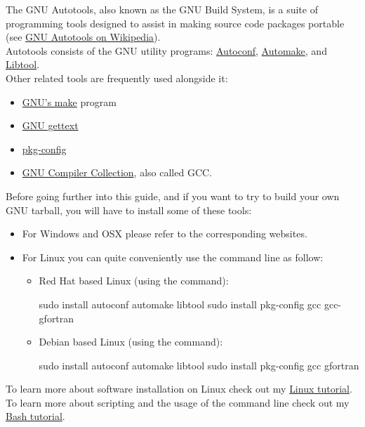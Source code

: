 The GNU Autotools, also known as the GNU Build System, is a suite of programming tools designed to assist in making source code packages portable (see \href{https://en.wikipedia.org/wiki/GNU\_Autotools}{GNU Autotools on Wikipedia}).  \\[0.25cm]
Autotools consists of the GNU utility programs: \href{https://www.gnu.org/software/autoconf/}{Autoconf}, 
\href{https://www.gnu.org/software/automake/}{Automake}, and \href{https://www.gnu.org/software/libtool}{Libtool}. \\
Other related tools are frequently used alongside it: 
\begin{itemize}
\item \href{https://www.gnu.org/software/make/}{GNU's make} program
\item \href{https://www.gnu.org/software/gettext/}{GNU gettext}
\item \href{https://en.wikipedia.org/wiki/Pkg-config}{pkg-config}
\item \href{https://www.gnu.org/software/gcc/}{GNU Compiler Collection}, also called GCC. 
\end{itemize}
Before going further into this guide, and if you want to try to build your own GNU tarball, you will have to install some of these tools: 
\begin{itemize}
\item For Windows and OSX please refer to the corresponding websites.
\item For Linux you can quite conveniently use the command line as follow:
\begin{itemize}
\item Red Hat based Linux (using the  command):
\begin{scriptii}
\fprompt{~} sudo  install autoconf automake libtool
\fprompt{~} sudo  install pkg-config gcc gcc-gfortran
\end{scriptii}
\item Debian based Linux (using the  command):
\begin{scriptii}
\fprompt{~} sudo  install autoconf automake libtool
\fprompt{~} sudo  install pkg-config gcc gfortran
\end{scriptii}
\end{itemize}
\end{itemize}
To learn more about software installation on Linux check out my \href{https://www.ipcms.fr/wp-content/uploads/2021/11/linux.pdf}{Linux tutorial}. \\
To learn more about scripting and the usage of the command line check out my \href{https://www.ipcms.fr/wp-content/uploads/2021/05/bash.pdf}{Bash tutorial}.
\clearpage

